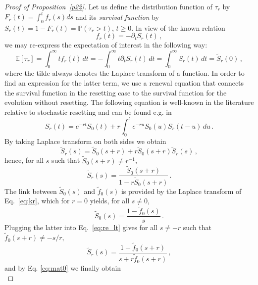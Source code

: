 \documentclass[preprint,12pt]{elsarticle}
\numberwithin{equation}{section}
\theoremstyle{plain} \newtheorem{theorem}{Theorem}[section]
\theoremstyle{plain} \newtheorem{proposition}[theorem]{Proposition}
\theoremstyle{plain} \newtheorem{lemma}[theorem]{Lemma}
\theoremstyle{plain} \newtheorem{corollary}[theorem]{Corollary}
\theoremstyle{definition} \newtheorem{definition}[theorem]{Definition}
\theoremstyle{definition} \newtheorem{notation}[theorem]{Notation}
\theoremstyle{remark} \newtheorem{remark}[theorem]{Remark}
\theoremstyle{remark} \newtheorem{remarks}[theorem]{Remarks}
\theoremstyle{remark} \newtheorem{algorithm2}[theorem]{Algorithm}
\theoremstyle{remark} \newtheorem{example}[theorem]{Example}
\newcommand{\E}{\mathbb{E}}
\newcommand{\PP}{\mathbb{P}}
\begin{document}
\begin{appendices}
\begin{proof}[Proof of Proposition~\ref{p22}]
\label{AP:proof_22}
Let us define the distribution function of $\tau_r$ by
$F_r(t)=\int_0^t f_r(s)ds$ and its
\emph{survival function} by 
$S_r(t)=1-F_r(t)=\PP(\tau_r>t)$, $t\geq 0$.
In view of the known relation
\begin{equation}
\label{eq:kr}
	f_r(t)=-\partial_t{S}_r(t)\,,
\end{equation} 
we may re-express the expectation of interest in the following way:
\begin{equation}
\label{eq:mat0}
	 \E [\tau_r]
    =\int_0^\infty t f_r (t)\,dt
	=-\int_0^\infty t \partial_t{S}_r (t)\,dt
	=\int_0^\infty S_r(t)\,dt
	= \tilde{S}_r(0)\,,
\end{equation}
where the tilde always denotes the Laplace transform of a function.
In order to find an expression for the latter term, we use a renewal equation that connects the survival function in the resetting case to
the survival function for the evolution without resetting.
The following equation is well-known in the literature relative to
stochastic resetting and can be found e.g. in \cite{evans_stochastic_2020,pal_first_2019, roldan_path-integral_2017}
\begin{equation*}
	S_r(t)=e^{-rt}S_0(t) + r\int_0^t e^{-ru}S_0(u)S_r(t-u)\,du\,.
\end{equation*}
By taking Laplace transform on both sides we obtain
\begin{equation*}
	\tilde{S}_r(s)=\tilde{S}_0(s+r)+r \tilde{S}_0(s+r) \tilde{S}_r(s)\,,
\end{equation*}
hence, for all $s$ such that $\tilde{S}_0(s+r) \neq r^{-1}$, 
\begin{equation}
\label{eq:re_lt}
	\tilde{S}_r(s)=\frac{\tilde{S}_0(s+r)}{1-r\tilde{S}_0(s+r)}\,.
\end{equation}
The link between $\tilde{S}_0(s)$ and $\tilde{f}_0(s)$ is provided by
the Laplace transform of Eq.~\eqref{eq:kr}, which for $r=0$ yields, for all $s \neq 0$,
\begin{equation*}
	\tilde{S}_0(s)=\frac{1-\tilde{f}_0(s)}{s}\,.
\end{equation*}
Plugging the latter into Eq.~\eqref{eq:re_lt} gives for all $s \neq - r$ such that $\tilde{f}_0(s+r) \neq -s/r$,
\begin{equation} \label{eq:tildeSr}
	\tilde{S}_r(s)
	=\frac{1-\tilde{f}_0(s+r)}{s+r\tilde{f}_0(s+r)}\,,
\end{equation}
and by Eq. \eqref{eq:mat0} we finally obtain
\begin{equation}

\end{equation}
\end{proof}
\end{appendices}
\end{document}
